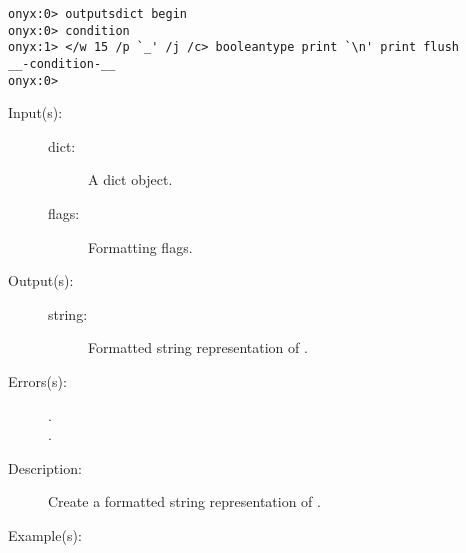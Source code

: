\begin{description}
\begin{description}
\begin{verbatim}
onyx:0> outputsdict begin
onyx:0> condition
onyx:1> </w 15 /p `_' /j /c> booleantype print `\n' print flush
__-condition-__
onyx:0>
		\end{verbatim}
	\end{description}
\label{outputsdict:dicttype}
\item[{\onyxop{dict flags}{dicttype}{string}}: ]
	\begin{description}\item[]
	\item[Input(s): ]
		\begin{description}\item[]
		\item[dict: ]
			A dict object.
		\item[flags: ]
			Formatting flags.
		\end{description}
	\item[Output(s): ]
		\begin{description}\item[]
		\item[string: ]
			Formatted string representation of .
		\end{description}
	\item[Errors(s): ]
		\begin{description}\item[]
		\item[.]
		\item[.]
		\end{description}
	\item[Description: ]
		Create a formatted string representation of .
	\item[Example(s): ]\begin{verbatim}


\end{verbatim}
\end{description}
\end{description}

